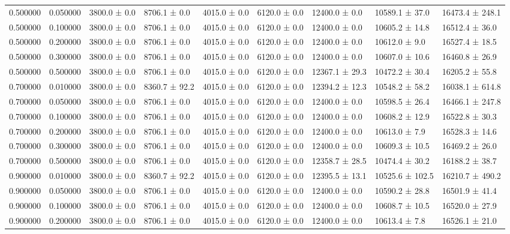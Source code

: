 \begin{table}
\begin{tabular}{rrlllllll}
0.500000 & 0.050000 & 3800.0 ± 0.0 & 8706.1 ± 0.0 & 4015.0 ± 0.0 & 6120.0 ± 0.0 & 12400.0 ± 0.0 & 10589.1 ± 37.0 & 16473.4 ± 248.1 \\
0.500000 & 0.100000 & 3800.0 ± 0.0 & 8706.1 ± 0.0 & 4015.0 ± 0.0 & 6120.0 ± 0.0 & 12400.0 ± 0.0 & 10605.2 ± 14.8 & 16512.4 ± 36.0 \\
0.500000 & 0.200000 & 3800.0 ± 0.0 & 8706.1 ± 0.0 & 4015.0 ± 0.0 & 6120.0 ± 0.0 & 12400.0 ± 0.0 & 10612.0 ± 9.0 & 16527.4 ± 18.5 \\
0.500000 & 0.300000 & 3800.0 ± 0.0 & 8706.1 ± 0.0 & 4015.0 ± 0.0 & 6120.0 ± 0.0 & 12400.0 ± 0.0 & 10607.0 ± 10.6 & 16460.8 ± 26.9 \\
0.500000 & 0.500000 & 3800.0 ± 0.0 & 8706.1 ± 0.0 & 4015.0 ± 0.0 & 6120.0 ± 0.0 & 12367.1 ± 29.3 & 10472.2 ± 30.4 & 16205.2 ± 55.8 \\
0.700000 & 0.010000 & 3800.0 ± 0.0 & 8360.7 ± 92.2 & 4015.0 ± 0.0 & 6120.0 ± 0.0 & 12394.2 ± 12.3 & 10548.2 ± 58.2 & 16038.1 ± 614.8 \\
0.700000 & 0.050000 & 3800.0 ± 0.0 & 8706.1 ± 0.0 & 4015.0 ± 0.0 & 6120.0 ± 0.0 & 12400.0 ± 0.0 & 10598.5 ± 26.4 & 16466.1 ± 247.8 \\
0.700000 & 0.100000 & 3800.0 ± 0.0 & 8706.1 ± 0.0 & 4015.0 ± 0.0 & 6120.0 ± 0.0 & 12400.0 ± 0.0 & 10608.2 ± 12.9 & 16522.8 ± 30.3 \\
0.700000 & 0.200000 & 3800.0 ± 0.0 & 8706.1 ± 0.0 & 4015.0 ± 0.0 & 6120.0 ± 0.0 & 12400.0 ± 0.0 & 10613.0 ± 7.9 & 16528.3 ± 14.6 \\
0.700000 & 0.300000 & 3800.0 ± 0.0 & 8706.1 ± 0.0 & 4015.0 ± 0.0 & 6120.0 ± 0.0 & 12400.0 ± 0.0 & 10609.3 ± 10.5 & 16469.2 ± 26.0 \\
0.700000 & 0.500000 & 3800.0 ± 0.0 & 8706.1 ± 0.0 & 4015.0 ± 0.0 & 6120.0 ± 0.0 & 12358.7 ± 28.5 & 10474.4 ± 30.2 & 16188.2 ± 38.7 \\
0.900000 & 0.010000 & 3800.0 ± 0.0 & 8360.7 ± 92.2 & 4015.0 ± 0.0 & 6120.0 ± 0.0 & 12395.5 ± 13.1 & 10525.6 ± 102.5 & 16210.7 ± 490.2 \\
0.900000 & 0.050000 & 3800.0 ± 0.0 & 8706.1 ± 0.0 & 4015.0 ± 0.0 & 6120.0 ± 0.0 & 12400.0 ± 0.0 & 10590.2 ± 28.8 & 16501.9 ± 41.4 \\
0.900000 & 0.100000 & 3800.0 ± 0.0 & 8706.1 ± 0.0 & 4015.0 ± 0.0 & 6120.0 ± 0.0 & 12400.0 ± 0.0 & 10608.7 ± 10.5 & 16520.0 ± 27.9 \\
0.900000 & 0.200000 & 3800.0 ± 0.0 & 8706.1 ± 0.0 & 4015.0 ± 0.0 & 6120.0 ± 0.0 & 12400.0 ± 0.0 & 10613.4 ± 7.8 & 16526.1 ± 21.0 \\

\end{tabular}
\end{table}
